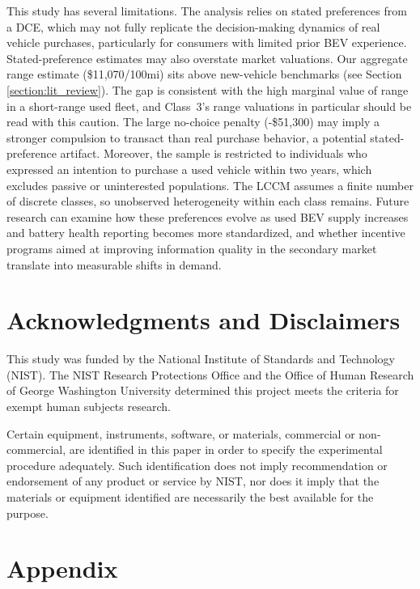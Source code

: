 \documentclass[a4paper,fleqn]{cas-sc}   %
\begin{document}
This study has several limitations. The analysis relies on stated preferences from a DCE, which may not fully replicate the decision-making dynamics of real vehicle purchases, particularly for consumers with limited prior BEV experience. Stated-preference estimates may also overstate market valuations. Our aggregate range estimate (\$11,070/100mi) sits above new-vehicle benchmarks (see Section \ref{section:lit_review}). The gap is consistent with the high marginal value of range in a short-range used fleet, and Class~3's range valuations in particular should be read with this caution. The large no-choice penalty (-\$51,300) may imply a stronger compulsion to transact than real purchase behavior, a potential stated-preference artifact. Moreover, the sample is restricted to individuals who expressed an intention to purchase a used vehicle within two years, which excludes passive or uninterested populations. The LCCM assumes a finite number of discrete classes, so unobserved heterogeneity within each class remains. Future research can examine how these preferences evolve as used BEV supply increases and battery health reporting becomes more standardized, and whether incentive programs aimed at improving information quality in the secondary market translate into measurable shifts in demand.

\section{Acknowledgments and Disclaimers}

This study was funded by the National Institute of Standards and Technology (NIST). The NIST Research Protections Office and the Office of Human Research of George Washington University determined this project meets the criteria for exempt human subjects research.
 
Certain equipment, instruments, software, or materials, commercial or non-commercial, are identified in this paper in order to specify the experimental procedure adequately. Such identification does not imply recommendation or endorsement of any product or service by NIST, nor does it imply that the materials or equipment identified are necessarily the best available for the purpose.
 

\section{Appendix}
\label{section:appendix}









\printcredits


\printbibliography
\end{document}
